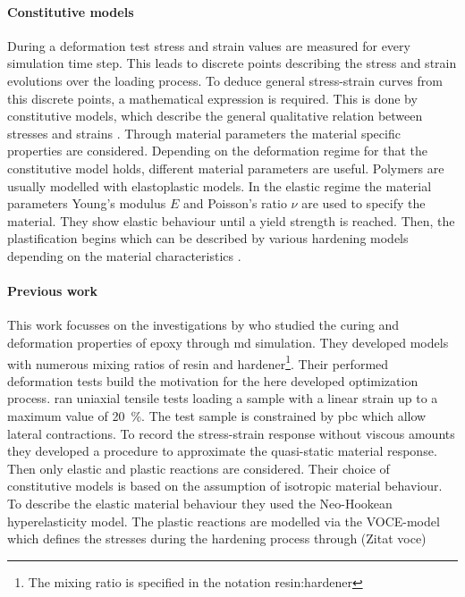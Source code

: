 \paragraph{Constitutive models}
During a deformation test stress and strain values are measured for every simulation time step. This leads to discrete points describing the stress and strain evolutions over the loading process. To deduce general stress-strain curves from this discrete points, a mathematical expression is required. This is done by constitutive models, which describe the general qualitative relation between stresses and strains \cite{mergheim_lecture_nodate}. Through material parameters the material specific properties are considered.
Depending on the deformation regime for that the constitutive model holds, different material parameters are useful. Polymers are usually modelled with elastoplastic models. In the elastic regime the material  parameters  Young's modulus $E$ and Poisson's ratio $\nu$ are used to specify the material. They show elastic behaviour until a yield strength is reached. 
Then, the plastification begins which can be described by various hardening models depending on the material characteristics \cite{mergheim_lecture_nodate}. 

\paragraph{Previous work}
This work focusses on the investigations by \citet{ries_deciphering_nodate} who studied the curing and deformation properties of epoxy through \acrshort{md} simulation. They developed models with numerous mixing ratios of resin and hardener\footnote{The mixing ratio is specified in the notation resin:hardener}. Their performed deformation tests build the motivation for the here developed optimization process. \citet{ries_deciphering_nodate} ran uniaxial tensile tests loading a sample with a linear strain up to a maximum value of 20 \%. The test sample is constrained by \acrshort{pbc} which allow lateral contractions. To record the stress-strain response without viscous amounts they developed a procedure to approximate the quasi-static material response. Then only elastic and plastic reactions are considered. Their choice of constitutive models is based on the assumption of isotropic material behaviour. To describe the elastic material behaviour they used the Neo-Hookean hyperelasticity model. The plastic reactions are modelled via the VOCE-model which defines the stresses during the hardening process through (Zitat voce)

